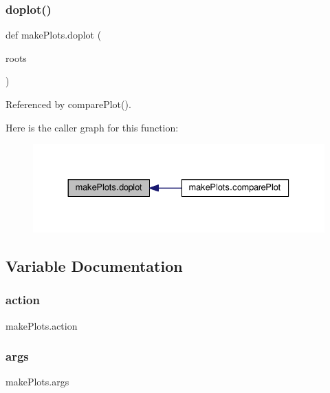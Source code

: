 \subsubsection{\texorpdfstring{doplot()}{doplot()}}
{\footnotesize\ttfamily def make\+Plots.\+doplot (\begin{DoxyParamCaption}\item[{}]{roots }\end{DoxyParamCaption})}



Referenced by compare\+Plot().

Here is the caller graph for this function\+:
\nopagebreak
\begin{figure}[H]
\begin{center}
\leavevmode
\includegraphics[width=330pt]{namespacemakePlots_a34cc3a765a66641e1e3c206e53215a8f_icgraph}
\end{center}
\end{figure}


\subsection{Variable Documentation}
\mbox{\label{namespacemakePlots_a76a9445ec7aead94905940da5ccc0ad9}} 
\subsubsection{\texorpdfstring{action}{action}}
{\footnotesize\ttfamily make\+Plots.\+action}

\mbox{\label{namespacemakePlots_a9da25c8831150382fe5c74d311978581}} 
\subsubsection{\texorpdfstring{args}{args}}
{\footnotesize\ttfamily make\+Plots.\+args}

